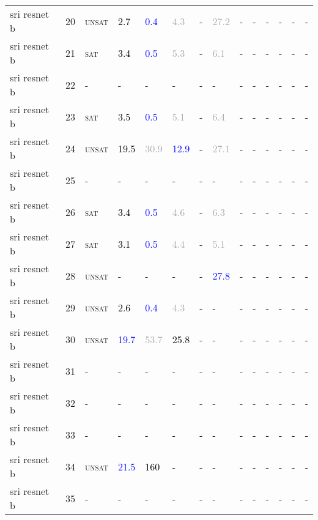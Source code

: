 \begin{center}
{\begin{longtable}{@{}llllllllllllll@{}}
sri resnet b & 20 & \textsc{unsat} & \textcolor{black}{2.7} & \textcolor{blue}{0.4} & \textcolor{darkgray}{4.3} & - & \textcolor{darkgray}{27.2} & - & - & - & - & - & - \\
sri resnet b & 21 & \textsc{sat} & \textcolor{black}{3.4} & \textcolor{blue}{0.5} & \textcolor{darkgray}{5.3} & - & \textcolor{darkgray}{6.1} & - & - & - & - & - & - \\
sri resnet b & 22 & - & - & - & - & - & - & - & - & - & - & - & - \\
sri resnet b & 23 & \textsc{sat} & \textcolor{black}{3.5} & \textcolor{blue}{0.5} & \textcolor{darkgray}{5.1} & - & \textcolor{darkgray}{6.4} & - & - & - & - & - & - \\
sri resnet b & 24 & \textsc{unsat} & \textcolor{black}{19.5} & \textcolor{darkgray}{30.9} & \textcolor{blue}{12.9} & - & \textcolor{darkgray}{27.1} & - & - & - & - & - & - \\
sri resnet b & 25 & - & - & - & - & - & - & - & - & - & - & - & - \\
sri resnet b & 26 & \textsc{sat} & \textcolor{black}{3.4} & \textcolor{blue}{0.5} & \textcolor{darkgray}{4.6} & - & \textcolor{darkgray}{6.3} & - & - & - & - & - & - \\
sri resnet b & 27 & \textsc{sat} & \textcolor{black}{3.1} & \textcolor{blue}{0.5} & \textcolor{darkgray}{4.4} & - & \textcolor{darkgray}{5.1} & - & - & - & - & - & - \\
sri resnet b & 28 & \textsc{unsat} & - & - & - & - & \textcolor{blue}{27.8} & - & - & - & - & - & - \\
sri resnet b & 29 & \textsc{unsat} & \textcolor{black}{2.6} & \textcolor{blue}{0.4} & \textcolor{darkgray}{4.3} & - & - & - & - & - & - & - & - \\
sri resnet b & 30 & \textsc{unsat} & \textcolor{blue}{19.7} & \textcolor{darkgray}{53.7} & \textcolor{black}{25.8} & - & - & - & - & - & - & - & - \\
sri resnet b & 31 & - & - & - & - & - & - & - & - & - & - & - & - \\
sri resnet b & 32 & - & - & - & - & - & - & - & - & - & - & - & - \\
sri resnet b & 33 & - & - & - & - & - & - & - & - & - & - & - & - \\
sri resnet b & 34 & \textsc{unsat} & \textcolor{blue}{21.5} & \textcolor{black}{160} & - & - & - & - & - & - & - & - & - \\
sri resnet b & 35 & - & - & - & - & - & - & - & - & - & - & - & - \\

\end{longtable}}
\end{center}
